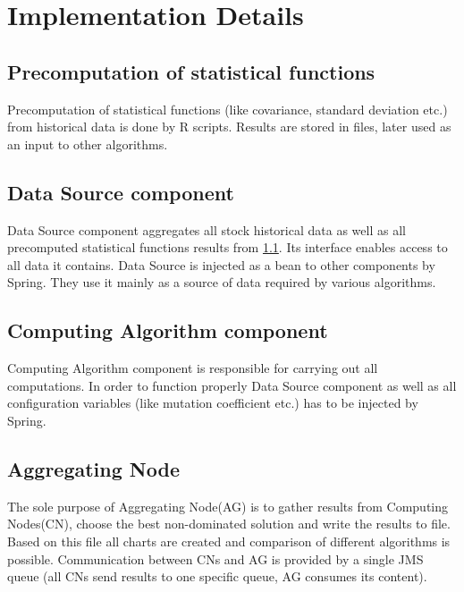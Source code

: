
\section{Implementation Details}
\label{sec:implDetails}

\subsection{Precomputation of statistical functions}
\label{precompute}
Precomputation of statistical functions (like covariance, standard deviation etc.) from historical data is done by R scripts. 
Results are stored in files, later used as an input to other algorithms.

\subsection{Data Source component}
\label{dataSource}

Data Source component aggregates all stock historical data as well as all precomputed statistical functions results from \ref{precompute}.   
Its interface enables access to all data it contains. Data Source is injected as a bean to other components by Spring.
They use it mainly as a source of data required by various algorithms.

\subsection{Computing Algorithm component}

Computing Algorithm component is responsible for carrying out all computations.
In order to function properly Data Source component as well as all configuration variables (like mutation coefficient etc.) has to be injected by Spring.

\subsection{Aggregating Node}

The sole purpose of Aggregating Node(AG) is to gather results from Computing Nodes(CN), choose the best non-dominated solution and write the results to file. 
Based on this file all charts are created and comparison of different algorithms is possible.
Communication between CNs and AG is provided by a single JMS queue (all CNs send results to one specific queue, AG consumes its content).


